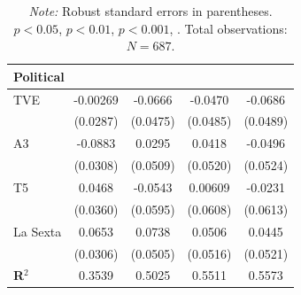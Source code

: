 \documentclass[12pt]{article}
\begin{document}
\begin{table}[htbp]
\begin{tabular}{lcccc}
	\multicolumn{5}{l}{\textbf{Political}}\\
	\hline
	TVE       & -0.00269      & -0.0666       & -0.0470       & -0.0686       \\
	& (0.0287)      & (0.0475)      & (0.0485)      & (0.0489)      \\
	A3        & -0.0883\sym{**}& 0.0295       & 0.0418        & -0.0496       \\
	& (0.0308)      & (0.0509)      & (0.0520)      & (0.0524)      \\
	T5        & 0.0468        & -0.0543       & 0.00609       & -0.0231       \\
	& (0.0360)      & (0.0595)      & (0.0608)      & (0.0613)      \\
	La Sexta  & 0.0653\sym{*} & 0.0738        & 0.0506        & 0.0445        \\
	& (0.0306)      & (0.0505)      & (0.0516)      & (0.0521)      \\
	\hline\hline
	\textbf{R$^2$} & 0.3539 & 0.5025 & 0.5511 & 0.5573 \\
	\hline\hline
\end{tabular}
\caption*{\small \textit{Note:} Robust standard errors in parentheses. 
	$p<0.05$, \sym{*} $p<0.01$, \sym{**} $p<0.001$, \sym{***}. 
	Total observations: $N=687$.}
	\end{table}
	
	
	
\end{document}
